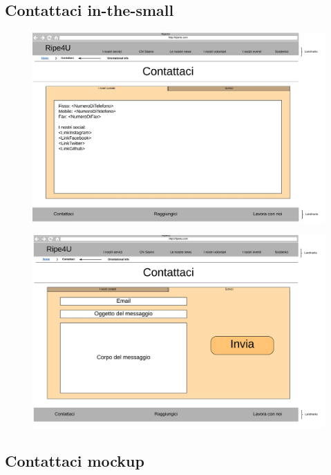         \subsection{Contattaci in-the-small}
        \begin{figure}[H]
            \centering
            \includegraphics[scale=0.37]{resources/images/contattaci1-in-the-small.jpg}
        \end{figure}
        \begin{figure}[H]
            \centering
            \includegraphics[scale=0.37]{resources/images/contattaci2-in-the-small.jpg}
        \end{figure}

        \subsection{Contattaci mockup}
    

